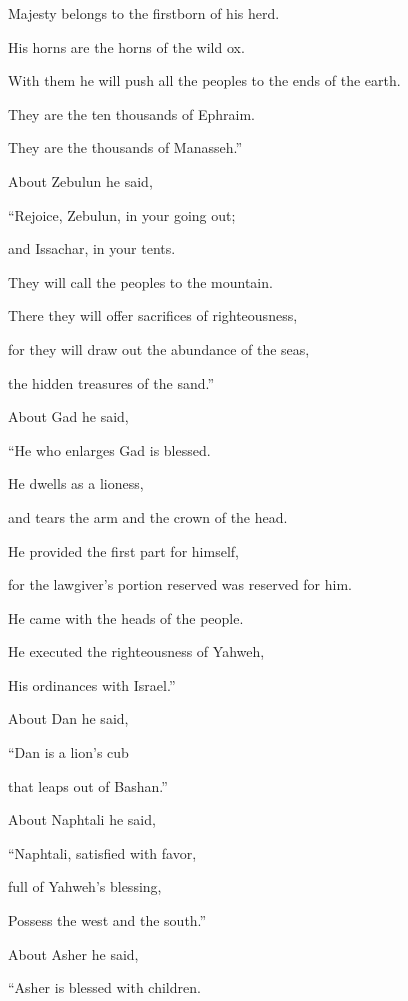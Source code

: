 {\par }{\Q {}Majesty belongs to the firstborn of his herd.
\par }{\QB His horns are the horns of the wild ox.
\par }{\QB With them he will push all the peoples to the ends of the earth.
\par }{\Q They are the ten thousands of Ephraim.
\par }{\QB They are the thousands of Manasseh.”
\par }{\PP {}About Zebulun he said,
\par }{\Q “Rejoice, Zebulun, in your going out;
\par }{\QB and Issachar, in your tents.
\par }{\Q {}They will call the peoples to the mountain.
\par }{\QB There they will offer sacrifices of righteousness,
\par }{\Q for they will draw out the abundance of the seas,
\par }{\QB the hidden treasures of the sand.”
\par }{\PP {}About Gad he said,
\par }{\Q “He who enlarges Gad is blessed.
\par }{\QB He dwells as a lioness,
\par }{\QB and tears the arm and the crown of the head.
\par }{\Q {}He provided the first part for himself,
\par }{\QB for the lawgiver’s portion reserved was reserved for him.
\par }{\Q He came with the heads of the people.
\par }{\QB He executed the righteousness of Yahweh,
\par }{\QB His ordinances with Israel.”
\par }{\PP {}About Dan he said,
\par }{\Q “Dan is a lion’s cub
\par }{\QB that leaps out of Bashan.”
\par }{\PP {}About Naphtali he said,
\par }{\Q “Naphtali, satisfied with favor,
\par }{\QB full of Yahweh’s blessing,
\par }{\QB Possess the west and the south.”
\par }{\PP {}About Asher he said,
\par }{\Q “Asher is blessed with children.
}
